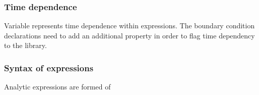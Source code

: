 \subsubsection{Time dependence}

Variable  represents time dependence within expressions. The
boundary condition declarations need to add an additional property
 in order to flag time dependency to
the library.


\subsubsection{Syntax of expressions}
\label{sec:xml:expressions:syntax}
Analytic expressions are formed of
